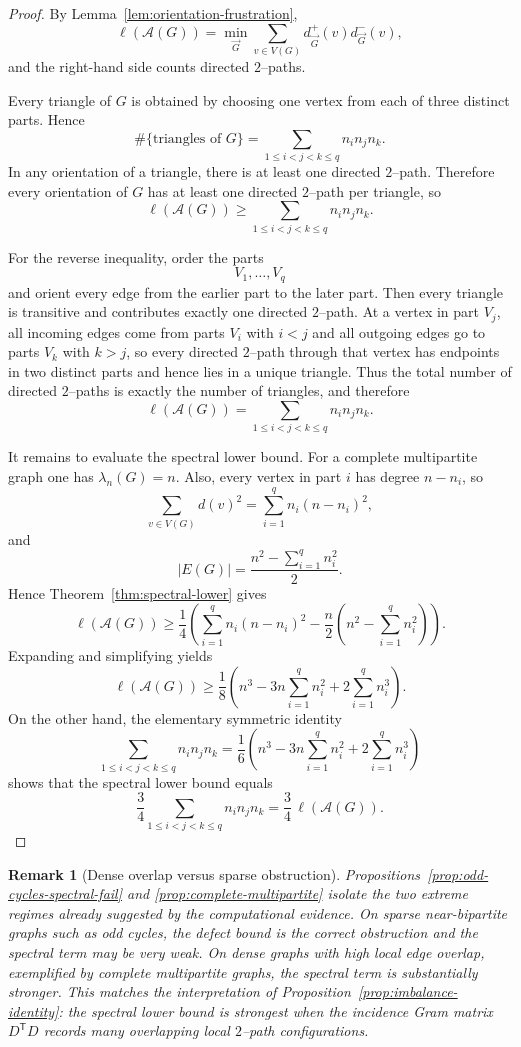 \documentclass[11pt]{article}
\newtheorem{remark}{Remark}
\theoremstyle{plain}
\begin{document}
\begin{proof}
By Lemma~\ref{lem:orientation-frustration},
\[
\ell(\mathcal A(G))
=
\min_{\vec G}\sum_{v\in V(G)} d^+_{\vec G}(v)d^-_{\vec G}(v),
\]
and the right-hand side counts directed $2$--paths.

Every triangle of $G$ is obtained by choosing one vertex from each of three
distinct parts. Hence
\[
\#\{\text{triangles of }G\}
=
\sum_{1\le i<j<k\le q} n_i n_j n_k.
\]
In any orientation of a triangle, there is at least one directed $2$--path.
Therefore every orientation of $G$ has at least one directed $2$--path per
triangle, so
\[
\ell(\mathcal A(G))
\ge
\sum_{1\le i<j<k\le q} n_i n_j n_k.
\]

For the reverse inequality, order the parts
\[
V_1,\dots,V_q
\]
and orient every edge from the earlier part to the later part.
Then every triangle is transitive and contributes exactly one directed
$2$--path.
At a vertex in part $V_j$, all incoming edges come from parts $V_i$ with $i<j$
and all outgoing edges go to parts $V_k$ with $k>j$, so every directed
$2$--path through that vertex has endpoints in two distinct parts and hence lies
in a unique triangle.
Thus the total number of directed $2$--paths is exactly the number of triangles,
and therefore
\[
\ell(\mathcal A(G))
=
\sum_{1\le i<j<k\le q} n_i n_j n_k.
\]

It remains to evaluate the spectral lower bound.
For a complete multipartite graph one has $\lambda_n(G)=n$.
Also, every vertex in part $i$ has degree $n-n_i$, so
\[
\sum_{v\in V(G)} d(v)^2=\sum_{i=1}^q n_i(n-n_i)^2,
\]
and
\[
|E(G)|=\frac{n^2-\sum_{i=1}^q n_i^2}{2}.
\]
Hence Theorem~\ref{thm:spectral-lower} gives
\[
\ell(\mathcal A(G))
\ge
\frac{1}{4}\left(\sum_{i=1}^q n_i(n-n_i)^2
-\frac{n}{2}\left(n^2-\sum_{i=1}^q n_i^2\right)\right).
\]
Expanding and simplifying yields
\[
\ell(\mathcal A(G))
\ge
\frac18\left(n^3-3n\sum_{i=1}^q n_i^2+2\sum_{i=1}^q n_i^3\right).
\]
On the other hand, the elementary symmetric identity
\[
\sum_{1\le i<j<k\le q} n_i n_j n_k
=
\frac16\left(n^3-3n\sum_{i=1}^q n_i^2+2\sum_{i=1}^q n_i^3\right)
\]
shows that the spectral lower bound equals
\[
\frac34\sum_{1\le i<j<k\le q} n_i n_j n_k
=
\frac34\,\ell(\mathcal A(G)).
\]
\end{proof}

\begin{remark}[Dense overlap versus sparse obstruction]
\label{rem:dense-sparse-regimes}
Propositions~\ref{prop:odd-cycles-spectral-fail} and
\ref{prop:complete-multipartite} isolate the two extreme regimes already
suggested by the computational evidence.
On sparse near-bipartite graphs such as odd cycles, the defect bound is the
correct obstruction and the spectral term may be very weak.
On dense graphs with high local edge overlap, exemplified by complete
multipartite graphs, the spectral term is substantially stronger.
This matches the interpretation of Proposition~\ref{prop:imbalance-identity}:
the spectral lower bound is strongest when the incidence Gram matrix
$D^{\mathsf T}D$ records many overlapping local $2$--path configurations.
\end{remark}
\end{document}
